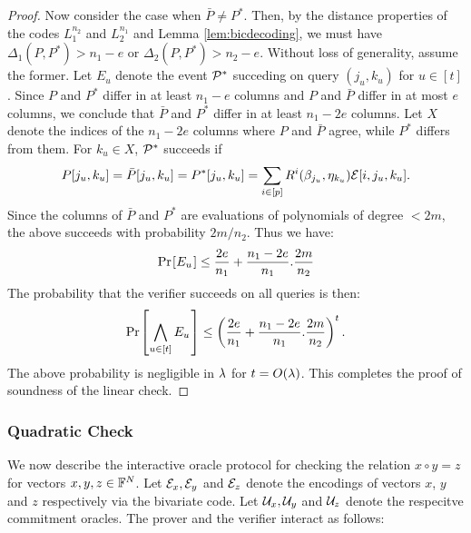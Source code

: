 \begin{proof}
Now consider the case when $\bar{P}\neq P^\ast$. Then, by the distance
properties of the codes $L_1^{n_2}$ and $L_2^{n_1}$ and Lemma
\ref{lem:bicdecoding}, we must have $\Delta_1(P,P^\ast)>n_1-e$ or
$\Delta_2(P,P^\ast)>n_2-e$. Without loss of generality, assume the
former. Let $E_u$ denote the event $\mathcal{P}^\ast$ succeding on query $(j_u,k_u)$
for $u\in [t]$. Since $P$ and $P^\ast$ differ in at least $n_1-e$ columns
and $P$ and $\bar{P}$ differ in at most $e$ columns, we conclude that $\bar{P}$
and $P^\ast$ differ in at least $n_1-2e$ columns. Let $X$ denote the indices of
the $n_1-2e$ columns where $P$ and $\bar{P}$ agree, while $P^\ast$ differs from
them. For $k_u\in X$,  $\mathcal{P}^\ast$ succeeds if
$$P[j_u,k_u]=\bar{P}[j_u,k_u]=P^\ast[j_u,k_u]=\sum_{i\in
[p]}R^i(\beta_{j_u},\eta_{k_u})\mathcal{E}[i,j_u,k_u].$$
Since the columns of $\bar{P}$ and $P^\ast$ are evaluations of polynomials of
degree $<2m$, the above succeeds with probability $2m/n_2$. Thus we have:
\begin{align*}
\prob{E_u}\leq \frac{2e}{n_1}+\frac{n_1-2e}{n_1}.\frac{2m}{n_2}
\end{align*}
The probability that the verifier succeeds on all queries is then:
\begin{align}
\prob{\bigwedge_{u\in [t]}E_u}\leq
\left(\frac{2e}{n_1}+\frac{n_1-2e}{n_1}.\frac{2m}{n_2}\right)^t.
\end{align}
The above probability is negligible in $\lambda$ for $t=O(\lambda)$. This completes the
proof of soundness of the linear check.
\end{proof}


\subsubsection{Quadratic Check}\label{sec:quadcheck}
We now describe the interactive oracle protocol for checking the relation
$x\circ y = z$ for vectors $x,y,z\in \mathbb{F}^N$. Let $\mathcal{E}_x,\mathcal{E}_y$ and
$\mathcal{E}_z$ denote the encodings of vectors $x$, $y$ and $z$ respectively via
the bivariate code. Let $\mathcal{U}_x,\mathcal{U}_y$ and $\mathcal{U}_z$ denote
the respecitve commitment oracles. The prover and the verifier interact as
follows:

